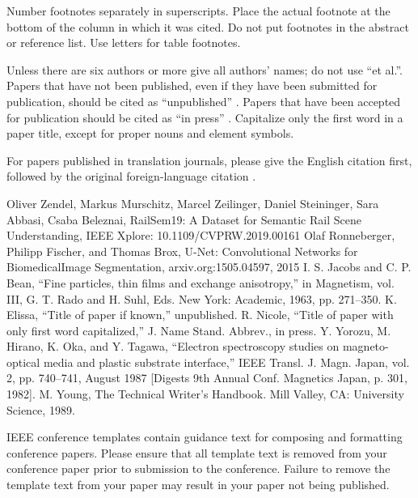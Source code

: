 \documentclass[conference]{IEEEtran}
\begin{document}
Number footnotes separately in superscripts. Place the actual footnote at 
the bottom of the column in which it was cited. Do not put footnotes in the 
abstract or reference list. Use letters for table footnotes.

Unless there are six authors or more give all authors' names; do not use 
``et al.''. Papers that have not been published, even if they have been 
submitted for publication, should be cited as ``unpublished'' \cite{b4}. Papers 
that have been accepted for publication should be cited as ``in press'' \cite{b5}. 
Capitalize only the first word in a paper title, except for proper nouns and 
element symbols.

For papers published in translation journals, please give the English 
citation first, followed by the original foreign-language citation \cite{b6}.

\begin{thebibliography}{00}
 Oliver Zendel, Markus Murschitz, Marcel Zeilinger, Daniel Steininger, Sara Abbasi, Csaba Beleznai, RailSem19: A Dataset for Semantic Rail Scene Understanding, IEEE Xplore: 10.1109/CVPRW.2019.00161
 Olaf Ronneberger, Philipp Fischer, and Thomas Brox, U-Net: Convolutional Networks for BiomedicalImage Segmentation, arxiv.org:1505.04597, 2015
 I. S. Jacobs and C. P. Bean, ``Fine particles, thin films and exchange anisotropy,'' in Magnetism, vol. III, G. T. Rado and H. Suhl, Eds. New York: Academic, 1963, pp. 271--350.
 K. Elissa, ``Title of paper if known,'' unpublished.
 R. Nicole, ``Title of paper with only first word capitalized,'' J. Name Stand. Abbrev., in press.
 Y. Yorozu, M. Hirano, K. Oka, and Y. Tagawa, ``Electron spectroscopy studies on magneto-optical media and plastic substrate interface,'' IEEE Transl. J. Magn. Japan, vol. 2, pp. 740--741, August 1987 [Digests 9th Annual Conf. Magnetics Japan, p. 301, 1982].
 M. Young, The Technical Writer's Handbook. Mill Valley, CA: University Science, 1989.
\end{thebibliography}
\vspace{12pt}
\color{red}
IEEE conference templates contain guidance text for composing and formatting conference papers. Please ensure that all template text is removed from your conference paper prior to submission to the conference. Failure to remove the template text from your paper may result in your paper not being published.
\end{document}
